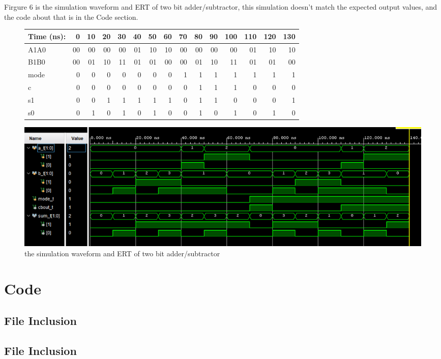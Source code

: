 \documentclass[11pt]{article}
\newcommand{\Verilog}[2][]{%
	
}
\begin{document}
Firgure 6 is the simulation waveform and ERT of two bit adder/subtractor, this simulation doesn't match the expected output values, and the code about that is in the Code section. \\
\begin{figure}[ht]\centering
	\begin{tabular}{l|rrrr|rrrr|rrrr|rr}
		Time (ns): & 0 & 10 & 20 & 30 & 40 & 50 & 60 & 70 & 80 & 90 & 100 & 110 & 120 & 130 \\
		\midrule
		A1A0 & 00 & 00 & 00 & 00 & 01 & 10 & 10 & 00 & 00 & 00 & 00 & 01 & 10 & 10 \\
		B1B0 & 00 & 01 & 10 & 11 & 01 & 01 & 00 & 00 & 01 & 10 & 11 & 01 & 01 & 00 \\
		mode & 0 & 0 & 0 & 0 & 0 & 0 & 0 & 1 & 1 & 1 & 1 & 1 & 1 & 1 \\
		\midrule
		c & 0 & 0 & 0 & 0 & 0 & 0 & 0 & 0 & 1 & 1 & 1 & 0 & 0 & 0 \\
		s1 & 0 & 0 & 1 & 1 & 1 & 1 & 1 & 0 & 1 & 1 & 0 & 0 & 0 & 1 \\
		s0 & 0 & 1 & 0 & 1 & 0 & 1 & 0 & 0 & 1 & 0 & 1 & 0 & 1 & 0 \\
		\bottomrule
	\end{tabular}\medskip
		
	\includegraphics[width=1\textwidth]{AddSubSimulation}
	\caption{the simulation waveform and ERT of two bit adder/subtractor}
	\label{fig:AddSubSimulation}
\end{figure}



\section*{Code}

\subsection*{File Inclusion}
\Verilog[caption=Half Adder Verilog code,label=code:file_ex]{halfadder.sv}

\subsection*{File Inclusion}
\Verilog[caption=Half Adder Test Benches Verilog code,label=code:file_ex]{halfadder_test.sv}
\end{document}
